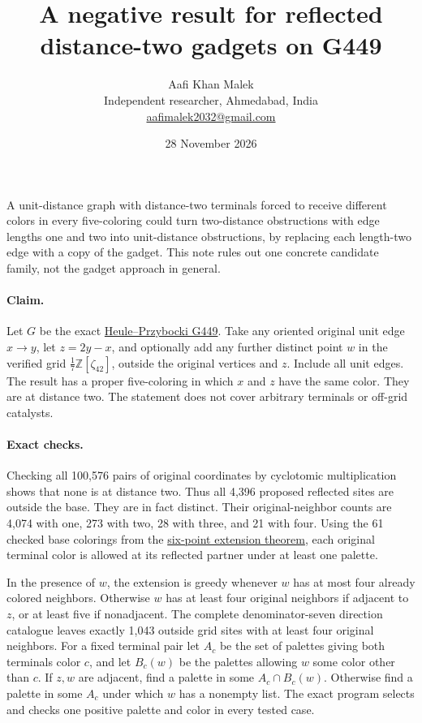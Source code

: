 \documentclass[10pt,letterpaper]{article}
\title{A negative result for reflected distance-two gadgets on G449}
\author{Aafi Khan Malek\\ \small Independent researcher, Ahmedabad, India\\
\small\href{mailto:aafimalek2032@gmail.com}{aafimalek2032@gmail.com}}
\date{28 November 2026}
\begin{document}
\maketitle
A unit-distance graph with distance-two terminals forced to
receive different colors in every five-coloring could turn
two-distance obstructions with edge lengths one and two into
unit-distance obstructions, by replacing each length-two
edge with a copy of the gadget. This note rules out one
concrete candidate family, not the gadget approach in general.

\paragraph{Claim.}
Let \(G\) be the exact
\href{https://arxiv.org/abs/2611.28518}{Heule--Przybocki G449}.
Take any oriented original unit edge \(x\to y\), let \(z=2y-x\),
and optionally add any further distinct point \(w\) in the
verified grid \(\tfrac17\mathbb{Z}[\zeta_{42}]\), outside the
original vertices and \(z\). Include all unit edges. The
result has a proper five-coloring in which \(x\) and \(z\)
have the same color. They are at distance two. The statement
does not cover arbitrary terminals or off-grid catalysts.

\paragraph{Exact checks.}
Checking all 100,576 pairs of original coordinates by
cyclotomic multiplication shows that none is at distance two.
Thus all 4,396 proposed reflected sites are outside the base.
They are in fact distinct. Their original-neighbor counts
are 4,074 with one, 273 with two, 28 with three, and 21 with
four. Using the 61 checked base colorings from the
\href{https://github.com/Aafimalek/novel-discoveries/tree/294c4596476e933f75703479fab2ea0f87e3723e/hadwiger-nelson/verification/g449/prime-seven-catalogue/six-point-extension-theorem}{six-point extension theorem},
each original terminal color is allowed at its reflected partner
under at least one palette.

In the presence of \(w\), the extension is greedy whenever
\(w\) has at most four already colored neighbors. Otherwise
\(w\) has at least four original neighbors if adjacent to \(z\),
or at least five if nonadjacent. The complete
denominator-seven direction catalogue leaves exactly 1,043
outside grid sites with at least four original neighbors.
For a fixed terminal pair let \(A_c\) be the set of palettes
giving both terminals color \(c\), and let \(B_c(w)\) be the
palettes allowing \(w\) some color other than \(c\).
If \(z,w\) are adjacent, find a palette in some
\(A_c\cap B_c(w)\). Otherwise find a palette in some
\(A_c\) under which \(w\) has a nonempty list.
The exact program selects and checks one positive palette
and color in every tested case.
\end{document}
